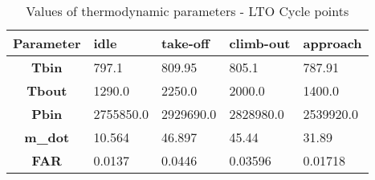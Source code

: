 \begin{table}[h!]
  \centering
  \begin{tabularx}{\textwidth}{||c|X|X|X|X||}
  \hline
    \cellcolor{gray!20}\textbf{Parameter} & \cellcolor{gray!20}\textbf{idle} & \cellcolor{gray!20}\textbf{take-off} & \cellcolor{gray!20}\textbf{climb-out} & \cellcolor{gray!20}\textbf{approach} \\ [0.5ex]
  \hline\hline
\centering
    \cellcolor{gray!20}\textbf{Tbin} & 797.1 & 809.95 & 805.1 & 787.91 \\
  \hline
    \cellcolor{gray!20}\textbf{Tbout} & 1290.0 & 2250.0 & 2000.0 & 1400.0 \\
  \hline
    \cellcolor{gray!20}\textbf{Pbin} & 2755850.0 & 2929690.0 & 2828980.0 & 2539920.0 \\
  \hline
    \cellcolor{gray!20}\textbf{m_dot} & 10.564 & 46.897 & 45.44 & 31.89 \\
  \hline
    \cellcolor{gray!20}\textbf{FAR} & 0.0137 & 0.0446 & 0.03596 & 0.01718 \\
  \hline
  \end{tabularx}
  \caption{Values of thermodynamic parameters - LTO Cycle points}
  \label{tab:Thermo}
\end{table}
